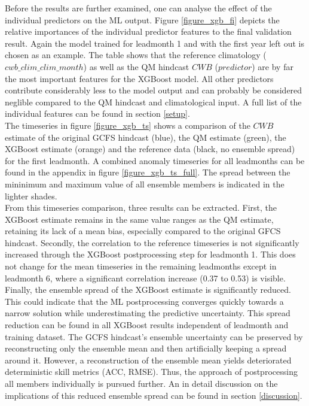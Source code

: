\documentclass[ba-lentz.tex]{subfile}
\begin{document}
Before the results are further examined, one can analyse the effect of the individual predictors on the ML output.
Figure \ref{figure_xgb_fi} depicts the relative importances of the individual predictor features to the final validation result.
Again the model trained for leadmonth 1 and with the first year left out is chosen as an example.
The table shows that the reference climatology ($cwb\_clim\_clim\_month$) as well as the QM hindcast $CWB$ ($predictor$) are by far the most important features for the XGBoost model.
All other predictors contribute considerably less to the model output and can probably be considered neglible compared to the QM hindcast and climatological input.
A full list of the individual features can be found in section \ref{setup}. \\
The timeseries in figure \ref{figure_xgb_ts} shows a comparison of the $CWB$ estimate of the original GCFS hindcast (blue), the QM estimate (green), the XGBoost estimate (orange) and the reference data (black, no ensemble spread) for the first leadmonth.
A combined anomaly timeseries for all leadmonths can be found in the appendix in figure \ref{figure_xgb_ts_full}.
The spread between the mininimum and maximum value of all ensemble members is indicated in the lighter shades. \\
From this timeseries comparison, three results can be extracted.
First, the XGBoost estimate remains in the same value ranges as the QM estimate, retaining its lack of a mean bias, especially compared to the original GFCS hindcast.
Secondly, the correlation to the reference timeseries is not significantly increased through the XGBoost postprocessing step for leadmonth 1.
This does not change for the mean timeseries in the remaining leadmonths except in leadmonth 6, where a significant correlation increase (0.37 to 0.53) is visible.
Finally, the ensemble spread of the XGBoost estimate is significantly reduced.
This could indicate that the ML postprocessing converges quickly towards a narrow solution while underestimating the predictive uncertainty.
This spread reduction can be found in all XGBoost results independent of leadmonth and training dataset.
The GCFS hindcast's ensemble uncertainty can be preserved by reconstructing only the ensemble mean and then artificially keeping a spread around it.
However, a reconstruction of the ensemble mean yields deteriorated deterministic skill metrics (ACC, RMSE).
Thus, the approach of postprocessing all members individually is pursued further.
An in detail discussion on the implications of this reduced ensemble spread can be found in section \ref{discussion}.\\
\end{document}
